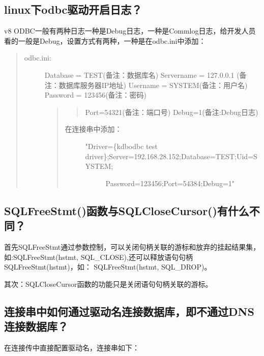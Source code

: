 \documentclass[a4,10pt,oneside,english]{sphinxmanual}
\begin{document}
\subsection{linux下odbc驱动开启日志？}
\label{\detokenize{interface/odbc:id3}}
v8 ODBC一般有两种日志一种是Debug日志，一种是Commlog日志，给开发人员看的一般是Debug，设置方式有两种，一种是在odbc.ini中添加：
\begin{quote}
\begin{description}
\item[{odbc.ini:}] \leavevmode
Database = TEST(备注：数据库名)
Servername = 127.0.0.1 (备注：数据库服务器IP地址)
Username = SYSTEM(备注：用户名)
Password = 123456(备注：密码)
\begin{quote}
\begin{quote}

Port=54321(备注：端口号)
Debug=1(备注:Debug日志)
\end{quote}
\begin{description}
\item[{在连接串中添加：}] \leavevmode\begin{description}
\item[{"Driver=\{kdbodbc test driver\};Server=192.168.28.152;Database=TEST;Uid=SYSTEM;}] \leavevmode
Password=123456;Port=54384;Debug=1"

\end{description}

\end{description}
\end{quote}

\end{description}
\end{quote}


\subsection{SQLFreeStmt()函数与SQLCloseCursor()有什么不同？}
\label{\detokenize{interface/odbc:sqlfreestmt-sqlclosecursor}}
首先SQLFreeStmt通过参数控制，可以关闭句柄关联的游标和放弃的挂起结果集，    如:SQLFreeStmt(hstmt, SQL\_CLOSE),还可以释放语句句柄SQLFreeStmt(hstmt)，如：  SQLFreeStmt(hstmt, SQL\_DROP)。

其次：SQLCloseCursor函数的功能只是关闭语句句柄关联的游标。


\subsection{连接串中如何通过驱动名连接数据库，即不通过DNS连接数据库？}
\label{\detokenize{interface/odbc:dns}}
在连接传中直接配置驱动名，连接串如下：
\end{document}
